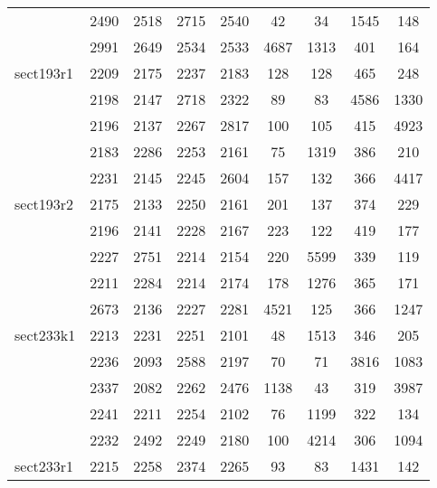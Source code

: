 \documentclass[a4paper, 8pt, envcountsect, runningheads]{article}
\begin{document}
\begin{center}
\begin{longtable}{ |l|c|c|c|c|c|c|c|c| }
	 & 2490 & 2518 & 2715 & 2540 & 42 & 34 & 1545 & 148 \\
	 
	 & 2991 & 2649 & 2534 & 2533 & 4687 & 1313 & 401 & 164 \\ \hline	
	 
	 sect193r1 & 2209 & 2175 & 2237 & 2183 & 128 & 128 & 465 & 248 \\
	 
	 & 2198 & 2147 & 2718 & 2322 & 89 & 83 & 4586 & 1330 \\
	 	 
	 & 2196 & 2137 & 2267 & 2817 & 100 & 105 & 415 & 4923 \\
	 
	 & 2183 & 2286 & 2253 & 2161 & 75 & 1319 & 386 &  210\\
	 
	 & 2231 & 2145 & 2245 & 2604 & 157 & 132 & 366 & 4417 \\ \hline	 
	 
	 sect193r2 & 2175 & 2133 & 2250 & 2161 & 201 & 137 & 374 & 229 \\
	 
	 & 2196 & 2141 & 2228 & 2167 & 223 & 122 & 419 & 177 \\
	 	 
	 & 2227 & 2751 & 2214 & 2154 & 220 & 5599 & 339 & 119 \\
	 
	 & 2211 & 2284 & 2214 & 2174 & 178 & 1276 & 365 & 171 \\
	 
	 & 2673 & 2136 & 2227 & 2281 & 4521 & 125 & 366 & 1247 \\ \hline	
	 
	 sect233k1 & 2213 & 2231 & 2251 & 2101 & 48 & 1513 & 346 & 205 \\
	 
	 & 2236 & 2093 & 2588 & 2197 & 70 & 71 & 3816 & 1083 \\
	 	 
	 & 2337 & 2082 & 2262 & 2476 & 1138 & 43 & 319 & 3987 \\
	 
	 & 2241 & 2211 & 2254 & 2102 & 76 & 1199 & 322 & 134 \\
	 
	 & 2232 & 2492 & 2249 & 2180 & 100 & 4214 & 306 & 1094 \\ \hline
	 
	 sect233r1 & 2215 & 2258 & 2374 & 2265 & 93 & 83 & 1431 & 142 \\
	 

\end{longtable}
\end{center}
\end{document}
